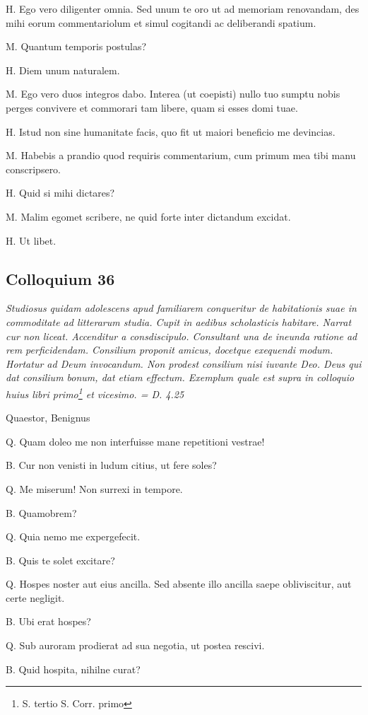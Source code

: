 \documentclass{article}
\begin{document}
H. Ego vero diligenter omnia. Sed unum te oro ut ad memoriam renovandam, des mihi eorum commentariolum et simul cogitandi ac deliberandi spatium.

M. Quantum temporis postulas?

H. Diem unum naturalem.

M. Ego vero duos integros dabo. Interea (ut coepisti) nullo tuo sumptu nobis perges convivere et commorari tam libere, quam si esses domi tuae.

H. Istud non sine humanitate facis, quo fit ut maiori beneficio me devincias.

M. Habebis a prandio quod requiris commentarium, cum primum mea tibi manu conscripsero.

H. Quid si mihi dictares?

M. Malim egomet scribere, ne quid forte inter dictandum excidat.

H. Ut libet.

\subsection{Colloquium 36}
\emph{Studiosus quidam adolescens apud familiarem conqueritur de habitationis suae in commoditate ad litterarum studia. Cupit in aedibus scholasticis habitare. Narrat cur non liceat. Accenditur a consdiscipulo. Consultant una de ineunda ratione ad rem perficidendam. Consilium proponit amicus, docetque exequendi modum. Hortatur ad Deum invocandum. Non prodest consilium nisi iuvante Deo. Deus qui dat consilium bonum, dat etiam effectum. Exemplum quale est supra in colloquio huius libri primo\footnote{S. tertio S. Corr. primo} et vicesimo. = D. 4.25}

Quaestor, Benignus

Q. Quam doleo me non interfuisse mane repetitioni vestrae!

B. Cur non venisti in ludum citius, ut fere soles?

Q. Me miserum! Non surrexi in tempore.

B. Quamobrem?

Q. Quia nemo me expergefecit.

B. Quis te solet excitare?

Q. Hospes noster aut eius ancilla. Sed absente illo ancilla saepe obliviscitur, aut certe negligit.

B. Ubi erat hospes?

Q. Sub auroram prodierat ad sua negotia, ut postea rescivi.

B. Quid hospita, nihilne curat?
\end{document}
